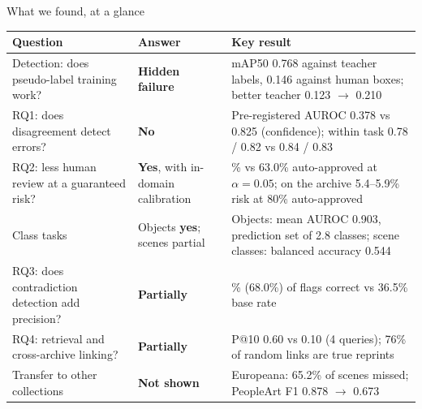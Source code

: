 \documentclass[aspectratio=169,10pt]{beamer}
\newcommand{\yes}[1]{{\color{okc}\bfseries #1}}
\newcommand{\no}[1]{{\color{pers}\bfseries #1}}
\begin{document}
\begin{frame}{What we found, at a glance}
\scriptsize
\renewcommand{\arraystretch}{1.22}
\begin{tabularx}{\textwidth}{@{}>{\raggedright\arraybackslash}p{4.1cm} >{\raggedright\arraybackslash}p{2.4cm} >{\raggedright\arraybackslash}X@{}}
\toprule
\textbf{Question} & \textbf{Answer} & \textbf{Key result}\\
\midrule
Detection: does pseudo-label training work? & \no{Hidden failure} & mAP50 0.768 against teacher labels, 0.146 against human boxes; better teacher 0.123 $\to$ 0.210\\
RQ1: does disagreement detect errors? & \no{No} & Pre-registered AUROC 0.378 vs 0.825 (confidence); within task 0.78 / 0.82 vs 0.84 / 0.83\\
RQ2: less human review at a guaranteed risk? & \yes{Yes}, with in-domain calibration & 76.4\% vs 63.0\% auto-approved at $\alpha=0.05$; on the archive 5.4--5.9\% risk at 80\% auto-approved\\
Class tasks & Objects \yes{yes}; scenes partial & Objects: mean AUROC 0.903, prediction set of 2.8 classes; scene classes: balanced accuracy 0.544\\
RQ3: does contradiction detection add precision? & {\color{risk}\textbf{Partially}} & 56.2\% (68.0\%) of flags correct vs 36.5\% base rate\\
RQ4: retrieval and cross-archive linking? & {\color{risk}\textbf{Partially}} & P@10 0.60 vs 0.10 (4 queries); 76\% of random links are true reprints\\
Transfer to other collections & \no{Not shown} & Europeana: 65.2\% of scenes missed; PeopleArt F1 0.878 $\to$ 0.673\\
\bottomrule
\end{tabularx}
\end{frame}
\end{document}
